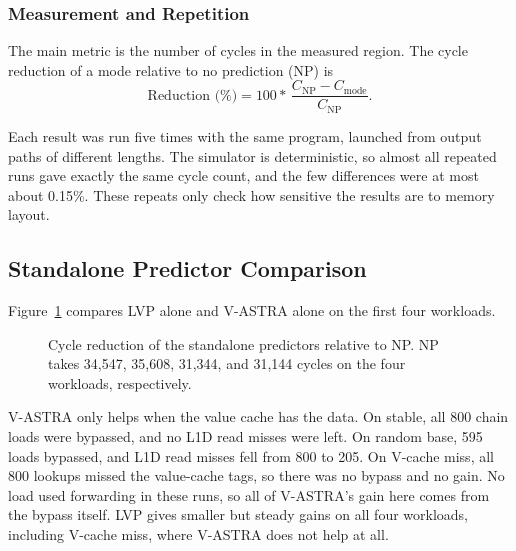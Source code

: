 \subsubsection{Measurement and Repetition}

The main metric is the number of cycles in the measured region. The
cycle reduction of a mode relative to no prediction (NP) is
\[
  \text{Reduction (\%)} =
  100*\,\frac{C_{\mathrm{NP}}-C_{\mathrm{mode}}}
  {C_{\mathrm{NP}}}.
\]

Each result was run five times with the same program, launched from
output paths of different lengths. The simulator is deterministic, so
almost all repeated runs gave exactly the same cycle count, and the
few differences were at most about 0.15\%. These repeats only check
how sensitive the results are to memory layout.

\subsection{Standalone Predictor Comparison}
\label{subsec:standalone-predictor-performance}

Figure~\ref{tab:standalone-predictor-cycles} compares LVP alone and
V-ASTRA alone on the first four workloads.

\begin{figure}[H]
    \centering
    \caption{Cycle reduction of the standalone predictors relative to NP.
    NP takes 34,547, 35,608, 31,344, and 31,144 cycles on the four
    workloads, respectively.}
    \label{tab:standalone-predictor-cycles}
\end{figure}

V-ASTRA only helps when the value cache has the data. On stable,
all 800 chain loads were bypassed, and no L1D read misses were left. On random base, 595 loads
bypassed, and L1D read misses fell from 800 to 205. On V-cache miss,
all 800 lookups missed the value-cache tags, so there was no bypass
and no gain. No load used forwarding in these runs, so all of
V-ASTRA's gain here comes from the bypass itself. LVP gives smaller
but steady gains on all four workloads, including V-cache miss, where
V-ASTRA does not help at all.

